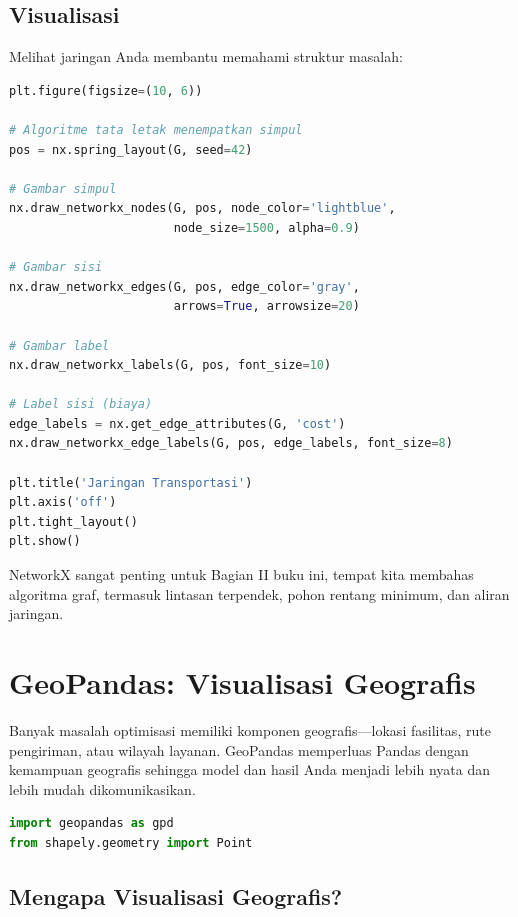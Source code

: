 \subsection{Visualisasi}

Melihat jaringan Anda membantu memahami struktur masalah:

\begin{lstlisting}[language=Python]
plt.figure(figsize=(10, 6))

# Algoritme tata letak menempatkan simpul
pos = nx.spring_layout(G, seed=42)

# Gambar simpul
nx.draw_networkx_nodes(G, pos, node_color='lightblue',
                       node_size=1500, alpha=0.9)

# Gambar sisi
nx.draw_networkx_edges(G, pos, edge_color='gray',
                       arrows=True, arrowsize=20)

# Gambar label
nx.draw_networkx_labels(G, pos, font_size=10)

# Label sisi (biaya)
edge_labels = nx.get_edge_attributes(G, 'cost')
nx.draw_networkx_edge_labels(G, pos, edge_labels, font_size=8)

plt.title('Jaringan Transportasi')
plt.axis('off')
plt.tight_layout()
plt.show()
\end{lstlisting}

\begin{info}
NetworkX sangat penting untuk Bagian II buku ini, tempat kita membahas algoritma graf, termasuk lintasan terpendek, pohon rentang minimum, dan aliran jaringan.
\end{info}

\section{GeoPandas: Visualisasi Geografis}

Banyak masalah optimisasi memiliki komponen geografis---lokasi fasilitas, rute pengiriman, atau wilayah layanan. GeoPandas memperluas Pandas dengan kemampuan geografis sehingga model dan hasil Anda menjadi lebih nyata dan lebih mudah dikomunikasikan.

\begin{lstlisting}[language=Python]
import geopandas as gpd
from shapely.geometry import Point
\end{lstlisting}

\subsection{Mengapa Visualisasi Geografis?}

